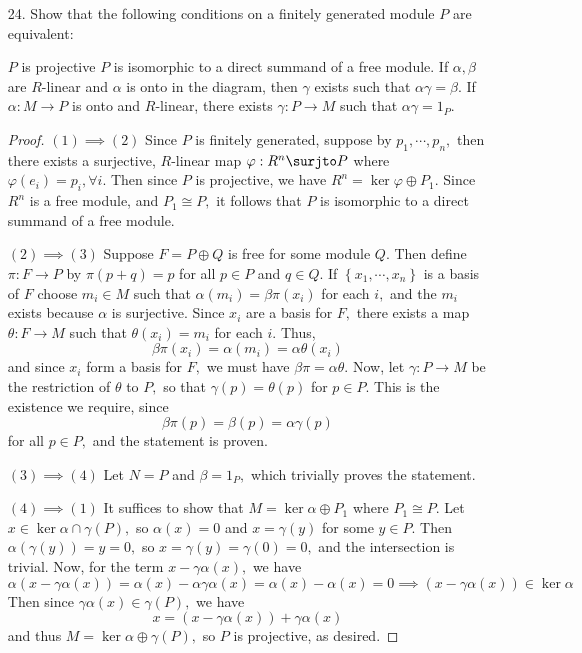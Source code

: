 \documentclass{article}
\begin{document}
\begin{itemize}
	\item[24.] Show that the following conditions on a finitely generated module $P$ are equivalent:
		\begin{enumerate}[(1)]
				\ii $P$ is projective
				\ii $P$ is isomorphic to a direct summand of a free module.
				\ii If $\alpha, \beta$ are $R$-linear and $\alpha$ is onto in the diagram, then $\gamma$ exists such that $\alpha\gamma=\beta.$
				\ii If $\alpha:M\to P$ is onto and $R$-linear, there exists $\gamma:P\to M$ such that $\alpha\gamma=1_P.$
		\end{enumerate}
		\begin{proof}
			$(1)\implies (2)$
			Since $P$ is finitely generated, suppose by $p_1, \cdots, p_n,$ then there exists a surjective, $R$-linear map $\varphi:R^n\surjto P$ where $\varphi(e_i)=p_i, \forall i.$ Then since $P$ is projective, we have $R^n=\ker\varphi\oplus P_1.$ Since $R^n$ is a free module, and $P_1\cong P,$ it follows that $P$ is isomorphic to a direct summand of a free module.

			$(2)\implies (3)$	
			Suppose $F=P\oplus Q$ is free for some module $Q.$ Then define $\pi:F\to P$ by $\pi(p+q)=p$ for all $p\in P$ and $q\in Q.$ If $\left\{ x_1, \cdots, x_n \right\}$ is a basis of $F$ choose $m_i\in M$ such that $\alpha(m_i)=\beta\pi(x_i)$ for each $i,$ and the $m_i$ exists because $\alpha$ is surjective. Since $x_i$ are a basis for $F,$ there exists a map $\theta:F\to M$ such that $\theta(x_i)=m_i$ for each $i.$ Thus,
			\[\beta\pi(x_i)=\alpha(m_i)=\alpha\theta(x_i)\]
			and since $x_i$ form a basis for $F,$ we must have $\beta\pi=\alpha\theta.$ Now, let $\gamma:P\to M$ be the restriction of $\theta$ to $P,$ so that $\gamma(p)=\theta(p)$ for $p\in P.$ This is the existence we require, since
			\[\beta\pi(p)=\beta(p)=\alpha\gamma(p)\]
			for all $p\in P,$ and the statement is proven.

			$(3)\implies (4)$
			Let $N=P$ and $\beta=1_P,$ which trivially proves the statement. 

			$(4)\implies (1)$
			It suffices to show that $M=\ker\alpha\oplus P_1$ where $P_1\cong P.$ Let $x\in\ker\alpha\cap \gamma(P),$ so $\alpha(x)=0$ and $x=\gamma(y)$ for some $y\in P.$ Then $\alpha(\gamma(y))=y=0,$ so $x=\gamma(y)=\gamma(0)=0,$ and the intersection is trivial. Now, for the term $x-\gamma\alpha(x),$ we have
			\[\alpha(x-\gamma\alpha(x))=\alpha(x)-\alpha\gamma\alpha(x)=\alpha(x)-\alpha(x)=0\implies (x-\gamma\alpha(x))\in\ker\alpha\]
			Then since $\gamma\alpha(x)\in \gamma(P),$ we have
			\[x=(x-\gamma\alpha(x))+\gamma\alpha(x)\]
			and thus $M=\ker\alpha\oplus\gamma(P),$ so $P$ is projective, as desired.
		\end{proof}


\end{itemize}
\end{document}
